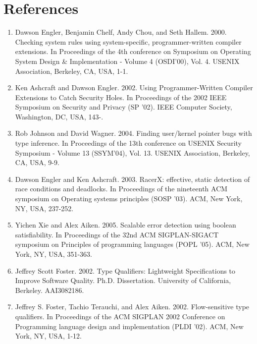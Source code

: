 \documentclass{article}
\begin{document}

\section{References}

\begin{enumerate}
	\item %
	Dawson Engler, Benjamin Chelf, Andy Chou, and Seth Hallem. 2000. Checking system rules using system-specific, programmer-written compiler extensions. In Proceedings of the 4th conference on Symposium on Operating System Design \& Implementation - Volume 4 (OSDI'00), Vol. 4. USENIX Association, Berkeley, CA, USA, 1-1. %
	\item %
	Ken Ashcraft and Dawson Engler. 2002. Using Programmer-Written Compiler Extensions to Catch Security Holes. In Proceedings of the 2002 IEEE Symposium on Security and Privacy (SP '02). IEEE Computer Society, Washington, DC, USA, 143-. %
	\item %
	Rob Johnson and David Wagner. 2004. Finding user/kernel pointer bugs with type inference. In Proceedings of the 13th conference on USENIX Security Symposium - Volume 13 (SSYM'04), Vol. 13. USENIX Association, Berkeley, CA, USA, 9-9. %
	\item %
	Dawson Engler and Ken Ashcraft. 2003. RacerX: effective, static detection of race conditions and deadlocks. In Proceedings of the nineteenth ACM symposium on Operating systems principles (SOSP '03). ACM, New York, NY, USA, 237-252. %
	\item %
	Yichen Xie and Alex Aiken. 2005. Scalable error detection using boolean satisfiability. In Proceedings of the 32nd ACM SIGPLAN-SIGACT symposium on Principles of programming languages (POPL '05). ACM, New York, NY, USA, 351-363. %
	\item %
	Jeffrey Scott Foster. 2002. Type Qualifiers: Lightweight Specifications to Improve Software Quality. Ph.D. Dissertation. University of California, Berkeley. AAI3082186. %
	\item %
	Jeffrey S. Foster, Tachio Terauchi, and Alex Aiken. 2002. Flow-sensitive type qualifiers. In Proceedings of the ACM SIGPLAN 2002 Conference on Programming language design and implementation (PLDI '02). ACM, New York, NY, USA, 1-12. %

\end{enumerate}
\end{document}
